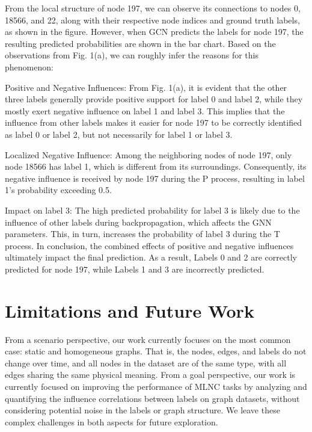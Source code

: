 From the local structure of node 197, we can observe its connections to nodes 0, 18566, and 22, along with their respective node indices and ground truth labels, as shown in the figure. However, when GCN predicts the labels for node 197, the resulting predicted probabilities are shown in the bar chart. Based on the observations from Fig. 1(a), we can roughly infer the reasons for this phenomenon:

Positive and Negative Influences: From Fig. 1(a), it is evident that the other three labels generally provide positive support for label 0 and label 2, while they mostly exert negative influence on label 1 and label 3. This implies that the influence from other labels makes it easier for node 197 to be correctly identified as label 0 or label 2, but not necessarily for label 1 or label 3.

Localized Negative Influence: Among the neighboring nodes of node 197, only node 18566 has label 1, which is different from its surroundings. Consequently, its negative influence is received by node 197 during the P process, resulting in label 1’s probability exceeding 0.5.

Impact on label 3: The high predicted probability for label 3 is likely due to the influence of other labels during backpropagation, which affects the GNN parameters. This, in turn, increases the probability of label 3 during the T process.
In conclusion, the combined effects of positive and negative influences ultimately impact the final prediction. As a result, Labels 0 and 2 are correctly predicted for node 197, while Labels 1 and 3 are incorrectly predicted.


\section{Limitations and Future Work}

From a scenario perspective, our work currently focuses on the most common case: static and homogeneous graphs. That is, the nodes, edges, and labels do not change over time, and all nodes in the dataset are of the same type, with all edges sharing the same physical meaning.
From a goal perspective, our work is currently focused on improving the performance of MLNC tasks by analyzing and quantifying the influence correlations between labels on graph datasets, without considering potential noise in the labels or graph structure. 
We leave these complex challenges in both aspects for future exploration.